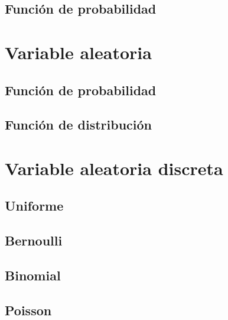 \documentclass[
]{book}
\begin{document}
\hypertarget{funciuxf3n-de-probabilidad}{%
\subsection{Función de probabilidad}\label{funciuxf3n-de-probabilidad}}

\hypertarget{variable-aleatoria}{%
\section{Variable aleatoria}\label{variable-aleatoria}}

\hypertarget{funciuxf3n-de-probabilidad-1}{%
\subsection{Función de probabilidad}\label{funciuxf3n-de-probabilidad-1}}

\hypertarget{funciuxf3n-de-distribuciuxf3n}{%
\subsection{Función de distribución}\label{funciuxf3n-de-distribuciuxf3n}}

\hypertarget{variable-aleatoria-discreta}{%
\section{Variable aleatoria discreta}\label{variable-aleatoria-discreta}}

\hypertarget{uniforme}{%
\subsection{Uniforme}\label{uniforme}}

\hypertarget{bernoulli}{%
\subsection{Bernoulli}\label{bernoulli}}

\hypertarget{binomial}{%
\subsection{Binomial}\label{binomial}}

\hypertarget{poisson}{%
\subsection{Poisson}\label{poisson}}
\end{document}
